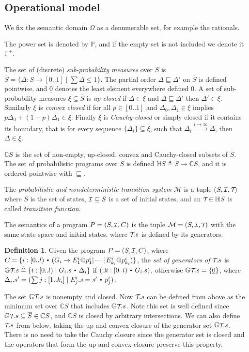 \documentclass{eptcs}
\theoremstyle{plain}
\theoremstyle{definition}
\newtheorem{definition}[theorem]{Definition}
\newcommand{\lit}[1]{\ensuremath{\mathit{#1}}}
\newcommand{\Prg}{P}
\newcommand{\Init}{\mbox{\small\ensuremath{\mathcal{I}}}}
\newcommand{\CGs}{C}
\newcommand{\Tau}{\mbox{\small\ensuremath{\mathcal{T}}}\!}
\newcommand{\CS}{\lit{\mathbb{C}S}}
\newcommand{\HS}{\lit{\mathbb{H}S}}
\newcommand{\GenTau}{\mathbb{G}\Tau}
\newcommand{\Power}{\lit{\mathbb{P}}} \newcommand{\PowerNonEmpty}{\lit{\mathbb{P}^+}}
\newcommand{\Def}{\ensuremath{\triangleq}}
\newcommand{\ra}{\ensuremath{\rightarrow}}
\newcommand{\dotsep}{\mbox{\raisebox{0.4ex}{\tiny\ensuremath{\:\;\bullet\;\:}}}}
\newcommand{\Const}[1]{\ensuremath{\underline{#1}}}
\newcommand{\SubPr}[1]{\ensuremath{\overline{#1}}}
\newcommand{\remark}[2]{}
\newcommand{\remarkN}[1]{\remark{N}{#1}}
\begin{document}
\subsection{Operational model}

We fix the semantic domain $\Omega$ as a denumerable set, for example the rationals.
\remarkN{explicar porque, asunto de medibilidad de $\Tau$}
The power set is denoted by $\Power$, and if the empty set is not included we denote it $\PowerNonEmpty$.

The set of (discrete) \emph{sub-probability measures} over $S$ is
$\SubPr{S} = \{ \Delta: S\ra [0..1] \mid \sum\Delta\leq 1 \}$.
The partial order $\Delta\sqsubseteq\Delta'$ on $\SubPr{S}$ is defined pointwise, and $\Const{0}$ denotes the least element everywhere defined $0$.
A set of sub-probability measures $\xi\subseteq\SubPr{S}$ is \emph{up-closed} if $\Delta\in\xi$ and $\Delta\sqsubseteq\Delta'$ then $\Delta'\in\xi$.
Similarly $\xi$ is \emph{convex closed} if for all $p\in[0..1]$ and $\Delta_0,\Delta_1\in\xi$ implies $p\Delta_0+(1-p)\Delta_1\in\xi$.
Finally $\xi$ is \emph{Cauchy-closed} or simply closed if it contains its boundary, that is for every sequence $\{\Delta_i\}\subseteq\xi$, such that $\Delta_i \stackrel{i\ra\infty}{\longrightarrow} \Delta$, then $\Delta\in\xi$.
\remarkN{no me gusta como queda el limite}
$\CS$ is the set of \mbox{non-empty}, \mbox{up-closed}, convex and \mbox{Cauchy-closed} subsets of $\SubPr{S}$.
The set of probabilistic programs over $S$ is defined $\HS \Def S \ra \CS$, and it is ordered pointwise with ${}\sqsubseteq{}$.

The \emph{probabilistic and nondeterministic transition system} $\mathcal{M}$ is a tuple $(S, \Init, \Tau)$
where $S$ is the set of states, $\Init \subseteq S$ is a set of initial states, and an $\Tau\in \HS$ is called \emph{transition function}.



The semantics of a program $\Prg = (S, \Init, \CGs)$ is the tuple $\mathcal{M} = (S, \Init, \Tau)$ with the same state space and initial states, where $\Tau.s$ is defined by its generators.
\begin{definition}
	Given the program $\Prg = (S, \Init, \CGs)$,
	where $\CGs=\{ i:[0..l) \dotsep (G_i \ra  E^i_1 @ p^i_1 | \cdots | E^i_{k_i} @ p^i_{k_i} ) \}$,
	the \emph{set of generators of $\Tau.s$} is 
	$\GenTau.s \Def \{ i:[0..l) \mid G_i.s \dotsep \Delta_i \} $ if $(\exists i:[0..l) \dotsep G_i.s)$,
	otherwise $\GenTau.s=\{\Const{0}\}$,
	where $\Delta_i.s' = ( \sum j: [1..k_i] \mid E_j^i.s = s' \dotsep p_j^i )$\enspace.
\end{definition}
The set $\GenTau.s$ is nonempty and closed. 
Now $\Tau.s$ can be defined from above as the minimum set over $\CS$ that includes $\GenTau.s$.
Note this set is well defined since $\GenTau.s\subseteq\SubPr{S}\in \CS$, and $\CS$ is closed by arbitrary intersections. 
We can also define $\Tau.s$ from below, taking the up and convex closure of the generator set $\GenTau.s$.
There is no need to take the Cauchy closure since the generator set is closed and the operators that form the up and convex closure preserve this property.
\end{document}
